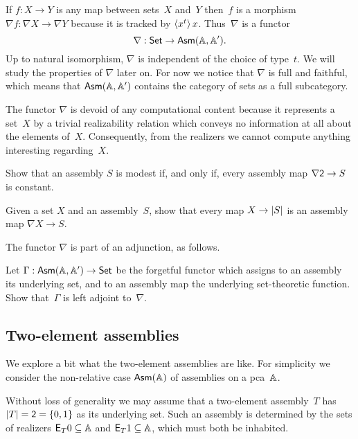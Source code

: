 If $f : X \to Y$ is any map between sets~$X$ and~$Y$ then~$f$ is a morphism $\nabla f : \nabla X \to \nabla Y$ because it is tracked by $\tpcalam{x}{t}{x}$. Thus~$\nabla$ is a functor
%
\begin{equation*}
  \nabla : \Set \to \AsmA.
\end{equation*}
%
Up to natural isomorphism, $\nabla$ is independent of the choice of
type~$t$. We will study the properties of $\nabla$ later on. For now
we notice that $\nabla$ is full and faithful, which means that
$\AsmA$ contains the category of sets as a full
subcategory.

The functor $\nabla$ is devoid of any computational content because it
represents a set~$X$ by a trivial realizability relation which conveys
no information at all about the elements of~$X$. Consequently, from
the realizers we cannot compute anything interesting regarding~$X$.

\begin{exercise}
  Show that an assembly $S$ is modest if, and only if, every assembly map $\nabla \two \to S$ is constant.
\end{exercise}

\begin{exercise}
  Given a set $X$ and an assembly~$S$, show that every map $X \to \S{S}$ is an assembly map $\nabla X \to S$.
\end{exercise}

The functor $\nabla$ is part of an adjunction, as follows.

\begin{exercise}
  Let $\Gamma : \AsmA \to \Set$ be the forgetful functor which assigns to an assembly its underlying set, and to an
  assembly map the underlying set-theoretic function. Show that~$\Gamma$ is left adjoint to~$\nabla$.
\end{exercise}


\subsection{Two-element assemblies}
\label{sec:two-elem-asm}

We explore a bit what the two-element assemblies are like. For simplicity we consider the non-relative case $\Asm{\AA}$ of assemblies on a pca~$\AA$.

Without loss of generality we may assume that a two-element assembly~$T$ has $\S{T} = \two = \{0, 1\}$ as its underlying set. Such an assembly is determined by the sets of realizers $\Ex{T} 0 \subseteq \AA$ and $\Ex{T} 1 \subseteq \AA$, which must both be inhabited.

